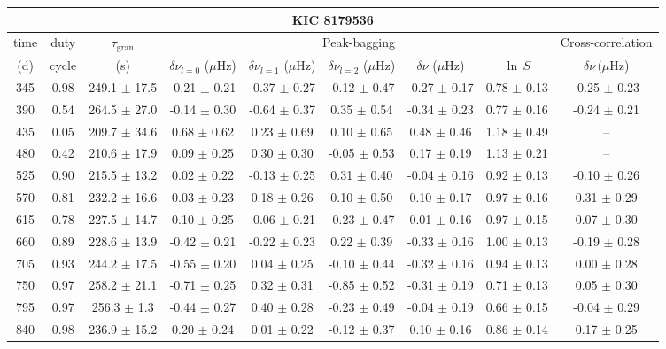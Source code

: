 \documentclass[twocolumn]{aastex61}%
\begin{document}
\begin{table*}[ht]\centering\fontsize{9.}{7.}\selectfont
\begin{tabular}{ccc|ccccc|c}
\multicolumn{9}{c}{KIC 8179536}\\ \hline\hline
time & duty & $\tau_\text{gran}$ &\multicolumn{5}{c|}{Peak-bagging}&Cross-correlation\\
(d)& cycle & (s)&$\delta\nu_{l=0}$ ($\mu$Hz) & $\delta\nu_{l=1}$ ($\mu$Hz) & $\delta\nu_{l=2}$ ($\mu$Hz) & $\delta\nu$ ($\mu$Hz)& $\ln\,S$ & $\delta\nu\,(\mu$Hz)\\\hline
345 & 0.98 & 249.1 $\pm$ 17.5 & -0.21 $\pm$ 0.21 & -0.37 $\pm$ 0.27 & -0.12 $\pm$ 0.47 & -0.27 $\pm$ 0.17 & 0.78 $\pm$ 0.13 & -0.25 $\pm$ 0.23\\
390 & 0.54 & 264.5 $\pm$ 27.0 & -0.14 $\pm$ 0.30 & -0.64 $\pm$ 0.37 & 0.35 $\pm$ 0.54 & -0.34 $\pm$ 0.23 & 0.77 $\pm$ 0.16 & -0.24 $\pm$ 0.21\\
435 & 0.05 & 209.7 $\pm$ 34.6 & 0.68 $\pm$ 0.62 & 0.23 $\pm$ 0.69 & 0.10 $\pm$ 0.65 & 0.48 $\pm$ 0.46 & 1.18 $\pm$ 0.49 & --\\
480 & 0.42 & 210.6 $\pm$ 17.9 & 0.09 $\pm$ 0.25 & 0.30 $\pm$ 0.30 & -0.05 $\pm$ 0.53 & 0.17 $\pm$ 0.19 & 1.13 $\pm$ 0.21 & --\\
525 & 0.90 & 215.5 $\pm$ 13.2 & 0.02 $\pm$ 0.22 & -0.13 $\pm$ 0.25 & 0.31 $\pm$ 0.40 & -0.04 $\pm$ 0.16 & 0.92 $\pm$ 0.13 & -0.10 $\pm$ 0.26\\
570 & 0.81 & 232.2 $\pm$ 16.6 & 0.03 $\pm$ 0.23 & 0.18 $\pm$ 0.26 & 0.10 $\pm$ 0.50 & 0.10 $\pm$ 0.17 & 0.97 $\pm$ 0.16 & 0.31 $\pm$ 0.29\\
615 & 0.78 & 227.5 $\pm$ 14.7 & 0.10 $\pm$ 0.25 & -0.06 $\pm$ 0.21 & -0.23 $\pm$ 0.47 & 0.01 $\pm$ 0.16 & 0.97 $\pm$ 0.15 & 0.07 $\pm$ 0.30\\
660 & 0.89 & 228.6 $\pm$ 13.9 & -0.42 $\pm$ 0.21 & -0.22 $\pm$ 0.23 & 0.22 $\pm$ 0.39 & -0.33 $\pm$ 0.16 & 1.00 $\pm$ 0.13 & -0.19 $\pm$ 0.28\\
705 & 0.93 & 244.2 $\pm$ 17.5 & -0.55 $\pm$ 0.20 & 0.04 $\pm$ 0.25 & -0.10 $\pm$ 0.44 & -0.32 $\pm$ 0.16 & 0.94 $\pm$ 0.13 & 0.00 $\pm$ 0.28\\
750 & 0.97 & 258.2 $\pm$ 21.1 & -0.71 $\pm$ 0.25 & 0.32 $\pm$ 0.31 & -0.85 $\pm$ 0.52 & -0.31 $\pm$ 0.19 & 0.71 $\pm$ 0.13 & 0.05 $\pm$ 0.30\\
795 & 0.97 & 256.3 $\pm$ 1.3 & -0.44 $\pm$ 0.27 & 0.40 $\pm$ 0.28 & -0.23 $\pm$ 0.49 & -0.04 $\pm$ 0.19 & 0.66 $\pm$ 0.15 & -0.04 $\pm$ 0.29\\
840 & 0.98 & 236.9 $\pm$ 15.2 & 0.20 $\pm$ 0.24 & 0.01 $\pm$ 0.22 & -0.12 $\pm$ 0.37 & 0.10 $\pm$ 0.16 & 0.86 $\pm$ 0.14 & 0.17 $\pm$ 0.25\\

\end{tabular}
\end{table*}
\end{document}
